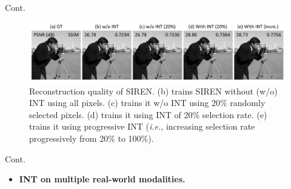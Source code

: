\documentclass[aspectratio=169,xcolor=dvipsnames]{beamer}
\newcommand{\ie}{\textit{\fontspec{Times New Roman}i.e.}}
\begin{document}
\begin{frame}{Cont.}
\begin{figure}
\centering
\includegraphics[width=\textwidth]{out/best_pred_summary.pdf}
\caption{Reconstruction quality of SIREN. (b) trains SIREN without (w/o) INT using all pixels. (c) trains it w/o INT using 20\% randomly selected pixels. (d) trains it using INT of 20\% selection rate. (e) trains it using progressive INT (\ie, increasing selection rate progressively from 20\% to 100\%).}
\end{figure}
\end{frame}

\begin{frame}{Cont.}
\vspace{-1mm}
\begin{itemize}
    \item {\bf INT on multiple real-world modalities.}
\end{itemize}


\begin{table}[t]
\centering
{}
\caption{Signal fitting results for different data modalities. The encoding time is measured excluding data I/O latency.}
\label{tab:signal_fitting}
\end{table}

\end{frame}
\end{document}
